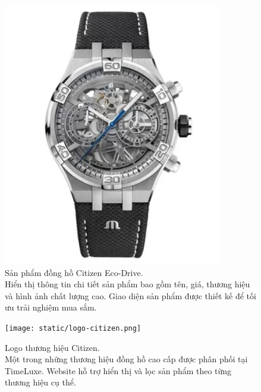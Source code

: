 \begin{figure}[htbp]
    \centering
    \includegraphics[width=0.85\textwidth]{static/dongho1.webp}
    \caption[Sản phẩm đồng hồ Citizen]{Sản phẩm đồng hồ Citizen Eco-Drive. \protect\\
    Hiển thị thông tin chi tiết sản phẩm bao gồm tên, giá, thương hiệu và hình ảnh chất lượng cao. Giao diện sản phẩm được thiết kế để tối ưu trải nghiệm mua sắm.}
    \label{fig:product}
\end{figure}

\begin{figure}[htbp]
    \centering
    \texttt{[image: static/logo-citizen.png]}
    \caption[Logo thương hiệu Citizen]{Logo thương hiệu Citizen. \protect\\
    Một trong những thương hiệu đồng hồ cao cấp được phân phối tại TimeLuxe. Website hỗ trợ hiển thị và lọc sản phẩm theo từng thương hiệu cụ thể.}
    \label{fig:citizen}
\end{figure}

